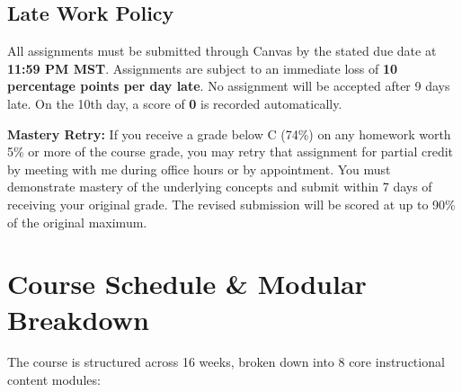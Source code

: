 \documentclass[11pt,a4paper]{article}
\begin{document}
\subsection*{Late Work Policy}
All assignments must be submitted through Canvas by the stated due date at \textbf{11:59 PM MST}. Assignments are subject to an immediate loss of \textbf{10 percentage points per day late}. No assignment will be accepted after 9 days late. On the 10th day, a score of \textbf{0} is recorded automatically.

\textbf{Mastery Retry:} If you receive a grade below C (74\%) on any homework worth 5\% or more of the course grade, you may retry that assignment for partial credit by meeting with me during office hours or by appointment. You must demonstrate mastery of the underlying concepts and submit within 7 days of receiving your original grade. The revised submission will be scored at up to 90\% of the original maximum.

\section*{Course Schedule \& Modular Breakdown}
The course is structured across 16 weeks, broken down into 8 core instructional content modules:
\end{document}
